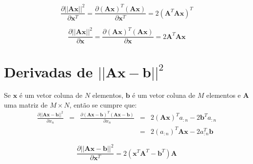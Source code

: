 \begin{corollaryT}
\begin{equation}
\frac{\partial ||\mathbf{A}\mathbf{x}||^2 }{\partial \mathbf{x}^{T}}=
\frac{\partial \left(\mathbf{A}\mathbf{x}\right)^{T}\left(\mathbf{A}\mathbf{x}\right)}{\partial \mathbf{x}^{T}}=
2\left(\mathbf{A}^{T}\mathbf{A}\mathbf{x}\right)^{T}
\end{equation}
\end{corollaryT}

\begin{corollaryT}
\begin{equation}
\frac{\partial ||\mathbf{A}\mathbf{x}||^2 }{\partial \mathbf{x}}=
\frac{\partial \left(\mathbf{A}\mathbf{x}\right)^{T}\left(\mathbf{A}\mathbf{x}\right)}{\partial \mathbf{x}}=
2 \mathbf{A}^{T}\mathbf{A}\mathbf{x}
\end{equation}
\end{corollaryT}


\section{Derivadas de $||\mathbf{A}\mathbf{x}-\mathbf{b}||^2$ 
}

\begin{theorem}
Se $\mathbf{x}$ é um vetor coluna de $N$ elementos,
$\mathbf{b}$ é um vetor coluna de $M$ elementos e 
$\mathbf{A}$ uma matriz de $M\times N$, então se cumpre que:
\begin{equation}
\begin{matrix}
\frac{\partial ||\mathbf{A}\mathbf{x}-\mathbf{b}||^2}{\partial x_n}&=&
\frac{\partial \left(\mathbf{A}\mathbf{x}-\mathbf{b}\right)^{T}\left(\mathbf{A}\mathbf{x}-\mathbf{b}\right)}{\partial x_n}&=&
2\left(\mathbf{A}\mathbf{x}\right)^{T}a_{:n}-2  \mathbf{b}^{T} a_{:n}\\
~&~&~&=& 2\left(a_{:n}\right)^{T}\mathbf{A}\mathbf{x}-2 a_{:n}^{T}  \mathbf{b}
\end{matrix}
\end{equation}
\end{theorem}


\begin{corollaryT}
\begin{equation}
\frac{\partial ||\mathbf{A}\mathbf{x}-\mathbf{b}||^2}{\partial \mathbf{x}^{T}}=
2\left(\mathbf{x}^{T}\mathbf{A}^{T}- \mathbf{b}^{T} \right)\mathbf{A}
\end{equation}
\end{corollaryT}


